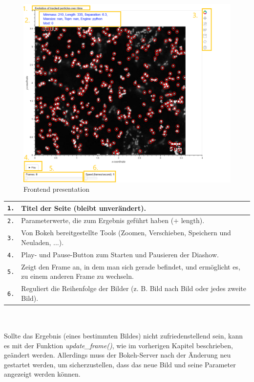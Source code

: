 \begin{enumerate}
	\begin{figure}[H]
    \centering
    \includegraphics[scale=0.5]{Grafiken/bokeh/GUI presentation.png}
    \caption{Frontend presentation}
    \label{fig:kap_App/GUI presentation}
\end{figure} 

\begin{tabular}{|l|p{12cm}|}
\hline
\texttt{1.} & Titel der Seite (bleibt unverändert). \\ \hline
\texttt{2.} & Parameterwerte, die zum Ergebnis geführt haben ($+$ length). \\ \hline
\texttt{3.} & Von Bokeh bereitgestellte Tools (Zoomen, Verschieben, Speichern und Neuladen, ...). \\ \hline
\texttt{4.} & Play- und Pause-Button zum Starten und Pausieren der Diashow. \\ \hline
\texttt{5.} & Zeigt den Frame an, in dem man sich gerade befindet, und ermöglicht es, zu einem anderen Frame zu wechseln. \\ \hline
\texttt{6.} & Reguliert die Reihenfolge der Bilder (z. B. Bild nach Bild oder jedes zweite Bild). \\ \hline
\hline
\end{tabular}
\\ \\

Sollte das Ergebnis (eines bestimmten Bildes) nicht zufriedenstellend sein, kann es mit der Funktion \textit{update\_frame()}, wie im vorherigen Kapitel beschrieben, geändert werden. Allerdings muss der Bokeh-Server nach der Änderung neu gestartet werden, um sicherzustellen, dass das neue Bild und seine Parameter angezeigt werden können. 
	
\end{enumerate}

